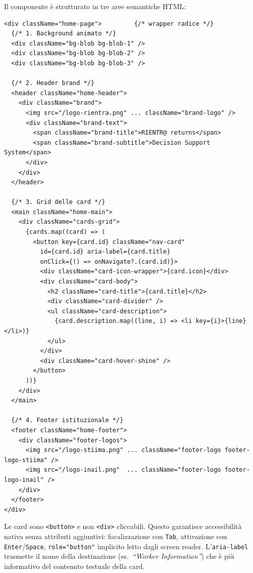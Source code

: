 \documentclass[a4paper,12pt]{article}
\renewcommand{\paragraph}[1]{%
  \par\vspace{4pt}%
  \noindent{\bfseries #1}\par\vspace{2pt}%
  \noindent\ignorespaces
}
\begin{document}
Il componente \`{e} strutturato in tre aree semantiche HTML:

\begin{lstlisting}
<div className="home-page">         {/* wrapper radice */}
  {/* 1. Background animato */}
  <div className="bg-blob bg-blob-1" />
  <div className="bg-blob bg-blob-2" />
  <div className="bg-blob bg-blob-3" />

  {/* 2. Header brand */}
  <header className="home-header">
    <div className="brand">
      <img src="/logo-rientra.png" ... className="brand-logo" />
      <div className="brand-text">
        <span className="brand-title">RIENTR@ returns</span>
        <span className="brand-subtitle">Decision Support System</span>
      </div>
    </div>
  </header>

  {/* 3. Grid delle card */}
  <main className="home-main">
    <div className="cards-grid">
      {cards.map((card) => (
        <button key={card.id} className="nav-card"
          id={card.id} aria-label={card.title}
          onClick={() => onNavigate?.(card.id)}>
          <div className="card-icon-wrapper">{card.icon}</div>
          <div className="card-body">
            <h2 className="card-title">{card.title}</h2>
            <div className="card-divider" />
            <ul className="card-description">
              {card.description.map((line, i) => <li key={i}>{line}</li>)}
            </ul>
          </div>
          <div className="card-hover-shine" />
        </button>
      ))}
    </div>
  </main>

  {/* 4. Footer istituzionale */}
  <footer className="home-footer">
    <div className="footer-logos">
      <img src="/logo-stiima.png" ... className="footer-logo footer-logo-stiima" />
      <img src="/logo-inail.png"  ... className="footer-logo footer-logo-inail" />
    </div>
  </footer>
</div>
\end{lstlisting}

\noindent \paragraph{Card come \texttt{<button>} HTML}
Le card sono \texttt{<button>} e non \texttt{<div>} cliccabili. Questo
garantisce accessibilit\`{a} nativa senza attributi aggiuntivi:
focalizzazione con \texttt{Tab}, attivazione con \texttt{Enter}/\texttt{Space},
\texttt{role="button"} implicito letto dagli screen reader.
L'\texttt{aria-label} trasmette il nome della destinazione (es.\
\textit{``Worker Information''}) che \`{e} pi\`{u} informativo del
contenuto testuale della card.
\end{document}
